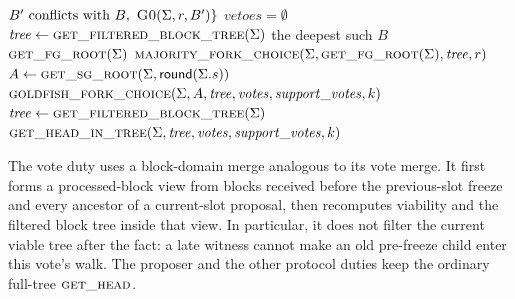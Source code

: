 \documentclass{article}
\theoremstyle{plain}
\theoremstyle{definition}
\theoremstyle{remark}
\newcommand{\round}{\mathsf{round}}
\newcommand{\fname}[1]{\text{\textsc{#1}}}
\begin{document}
{\begin{algorithmic}[1]
  \Statex \hspace{4.35em} $B'\text{ conflicts with }B,\
    \Call{G0}{\Sigma,r,B'}\}$
  \State \Return $\mathit{vetoes}=\emptyset$
\EndFunction
\vspace{1pt}
  \State $\mathit{tree}\gets\Call{get\_filtered\_block\_tree}{\Sigma}$
    \State \Return the deepest such $B$
    \State \Return $\fname{get\_fg\_root}(\Sigma)$
  \EndIf
  \State \Return $\Call{majority\_fork\_choice}{\Sigma,
    \fname{get\_fg\_root}(\Sigma),\mathit{tree},r}$
\EndFunction
\vspace{1pt}
  \State $A\gets\Call{get\_sg\_root}{\Sigma,\round(\Sigma.s)}$
  \State \Return $\Call{goldfish\_fork\_choice}{\Sigma,A,
    \mathit{tree},\mathit{votes},\mathit{support\_votes},k}$
\EndFunction
\vspace{1pt}
  \Comment{\S\ref{sec:fg-fork-choice}, unchanged}
  \State $\mathit{tree}\gets\Call{get\_filtered\_block\_tree}{\Sigma}$
  \State \Return $\Call{get\_head\_in\_tree}{\Sigma,\mathit{tree},
    \mathit{votes},\mathit{support\_votes},k}$
\EndFunction
\end{algorithmic}
}

The vote duty uses a block-domain merge analogous to its vote merge.
It first forms a processed-block view from blocks received before the
previous-slot freeze and every ancestor of a current-slot proposal, then
recomputes viability and the filtered block tree inside that view.  In
particular, it does not filter the current viable tree after the fact: a
late witness cannot make an old pre-freeze child enter this vote's walk.
The proposer and the other protocol duties keep the ordinary full-tree
$\Call{get\_head}{}$.
\end{document}
